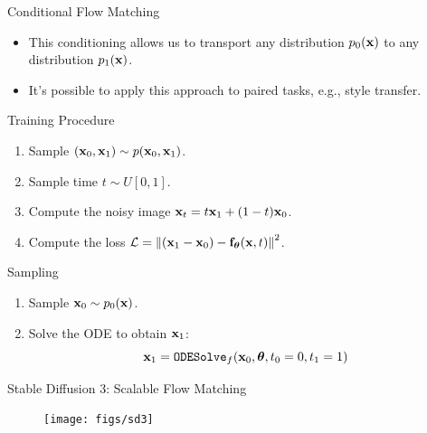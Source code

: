 \documentclass{beamer}
\begin{document}
\begin{frame}{Conditional Flow Matching}
	\begin{itemize}
		\item This conditioning allows us to transport any distribution $p_0(\mathbf{x})$ to any distribution $p_1(\mathbf{x})$.
		\item It's possible to apply this approach to paired tasks, e.g., style transfer.
	\end{itemize}
	\begin{block}{Training Procedure}
		\begin{enumerate}
			\item Sample $(\mathbf{x}_0, \mathbf{x}_1) \sim p(\mathbf{x}_0, \mathbf{x}_1)$.
			\item Sample time $t \sim U[0, 1]$.
			\item Compute the noisy image $\mathbf{x}_t = t \mathbf{x}_1 + (1 - t) \mathbf{x}_0$.
			\item Compute the loss $ \mathcal{L} = \left\| (\mathbf{x}_1 - \mathbf{x}_0) - \mathbf{f}_{\boldsymbol{\theta}}(\mathbf{x}, t) \right\|^2 $.
		\end{enumerate}
	\end{block}
	\vspace{-0.3cm}
	\begin{block}{Sampling}
		\begin{enumerate}
			\item Sample $\mathbf{x}_0 \sim p_0(\mathbf{x})$.
			\item Solve the ODE to obtain $\mathbf{x}_1$:
			\[
				\mathbf{x}_1 = \texttt{ODESolve}_f(\mathbf{x}_0, \boldsymbol{\theta}, t_0=0, t_1=1)
			\]
		\end{enumerate}
	\end{block}
\end{frame}
\begin{frame}{Stable Diffusion 3: Scalable Flow Matching}
	\begin{figure}
		\centering
		\texttt{[image: figs/sd3]}
	\end{figure}
\end{frame}
\end{document}
